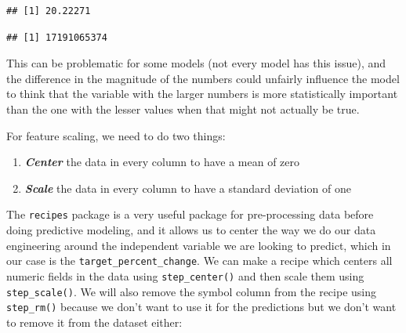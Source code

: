 \documentclass[
]{book}
\newenvironment{Shaded}{\begin{snugshade}}{\end{snugshade}}
\newcommand{\DataTypeTok}[1]{\textcolor[rgb]{0.13,0.29,0.53}{#1}}
\newcommand{\KeywordTok}[1]{\textcolor[rgb]{0.13,0.29,0.53}{\textbf{#1}}}
\newcommand{\NormalTok}[1]{#1}
\newcommand{\OperatorTok}[1]{\textcolor[rgb]{0.81,0.36,0.00}{\textbf{#1}}}
\newcommand{\StringTok}[1]{\textcolor[rgb]{0.31,0.60,0.02}{#1}}
\begin{document}
\begin{verbatim}
## [1] 20.22271
\end{verbatim}

\begin{Shaded}
\end{Shaded}

\begin{verbatim}
## [1] 17191065374
\end{verbatim}

This can be problematic for some models (not every model has this issue), and the difference in the magnitude of the numbers could unfairly influence the model to think that the variable with the larger numbers is more statistically important than the one with the lesser values when that might not actually be true.

For feature scaling, we need to do two things:

\begin{enumerate}
\def\labelenumi{\arabic{enumi}.}
\item
  \textbf{\emph{Center}} the data in every column to have a mean of zero
\item
  \textbf{\emph{Scale}} the data in every column to have a standard deviation of one
\end{enumerate}

The \texttt{recipes} \citep{R-recipes} package is a very useful package for pre-processing data before doing predictive modeling, and it allows us to center the way we do our data engineering around the independent variable we are looking to predict, which in our case is the \texttt{target\_percent\_change}. We can make a recipe which centers all numeric fields in the data using \texttt{step\_center()} and then scale them using \texttt{step\_scale()}. We will also remove the symbol column from the recipe using \texttt{step\_rm()} because we don't want to use it for the predictions but we don't want to remove it from the dataset either:

\begin{Shaded}
\end{Shaded}
\end{document}
